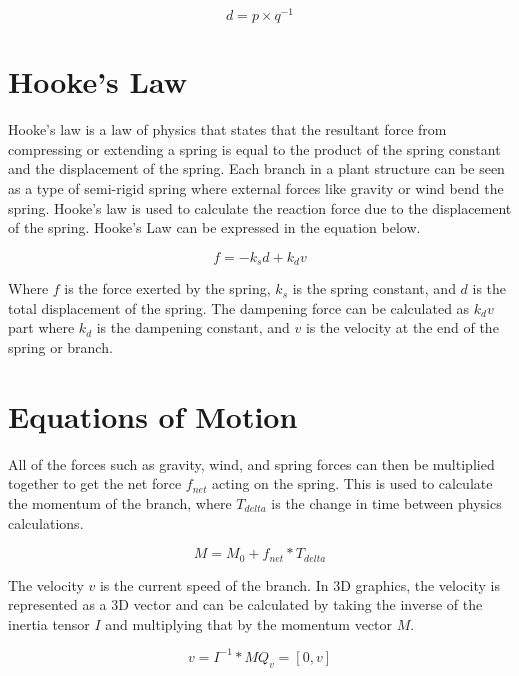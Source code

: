 \begin{equation}
d = p \times q^{-1}
\end{equation}

\section{Hooke's Law} \label{hookes law}

Hooke's law is a law of physics that states that the resultant force from compressing or extending a spring is equal to the product of the spring constant and the displacement of the spring. Each branch in a plant structure can be seen as a type of semi-rigid spring where external forces like gravity or wind bend the spring. Hooke's law is used to calculate the reaction force due to the displacement of the spring. Hooke's Law can be expressed in the equation below.

\begin{equation}
f = -k _s d + k _d v
\end{equation}

\noindent
Where $f$ is the force exerted by the spring, $k _s$ is the spring constant, and $d$ is the total displacement of the spring. The dampening force can be calculated as $k _d v$ part where $k _d$ is the dampening constant, and $v$ is the velocity at the end of the spring or branch.


\section{Equations of Motion} \label{motion equations}

All of the forces such as gravity, wind, and spring forces can then be multiplied together to get the net force $f_{net}$ acting on the spring. This is used to calculate the momentum of the branch, where $T_{delta}$ is the change in time between physics calculations.

\begin{equation}
M = M_0 + f_{net} * T_{delta}
\end{equation}

\noindent
The velocity $v$ is the current speed of the branch. In 3D graphics, the velocity is represented as a 3D vector and can be calculated by taking the inverse of the inertia tensor $I$ and multiplying that by the momentum vector $M$.

\begin{equation}
v = I^{-1} * M
Q_v = [0, v]
\end{equation}

